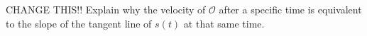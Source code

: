 {CHANGE THIS!!
Explain why the velocity of $\mathcal{O}$ after a specific time is equivalent to the slope of the tangent line of $s(t)$ at that same time.}
{}